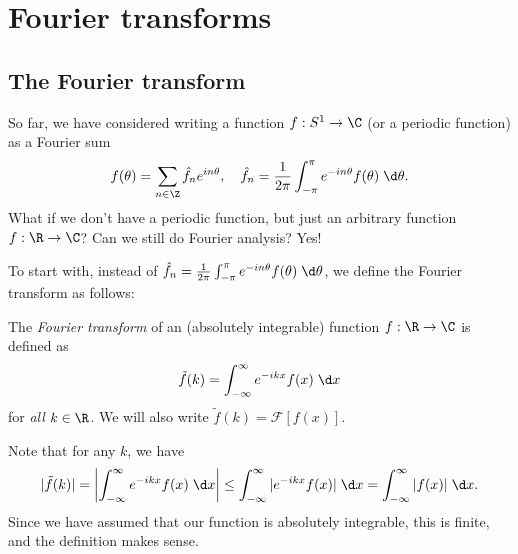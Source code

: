 \documentclass[a4paper]{article}
\begin{document}
\section{Fourier transforms}
\subsection{The Fourier transform}
So far, we have considered writing a function $f: S^1 \to \C$ (or a periodic function) as a Fourier sum
\[
  f(\theta) = \sum_{n \in \Z} \hat{f}_n e^{in\theta},\quad \hat{f}_n = \frac{1}{2\pi}\int_{-\pi}^\pi e^{-in\theta}f(\theta)\;\d \theta.
\]
What if we don't have a periodic function, but just an arbitrary function $f:\R \to \C$? Can we still do Fourier analysis? Yes!

To start with, instead of $\hat{f}_n = \frac{1}{2\pi}\int_{-\pi}^\pi e^{-in\theta }f(\theta)\;\d \theta$, we define the Fourier transform as follows:
\begin{defi}
  The \emph{Fourier transform} of an (absolutely integrable) function $f: \R \to \C$ is defined as
  \[
    \tilde{f}(k) = \int_{-\infty}^\infty e^{-ikx}f(x)\;\d x
  \]
  for \emph{all} $k \in \R$. We will also write $\tilde{f}(k) = \mathcal{F}[f(x)]$.
\end{defi}
Note that for any $k$, we have
\[
  |\tilde{f}(k)| = \left|\int_{-\infty}^\infty e^{-ikx}f(x)\;\d x\right| \leq \int_{-\infty}^\infty |e^{-ikx} f(x)|\;\d x = \int_{-\infty}^\infty |f(x)|\;\d x.
\]
Since we have assumed that our function is absolutely integrable, this is finite, and the definition makes sense.
\end{document}
